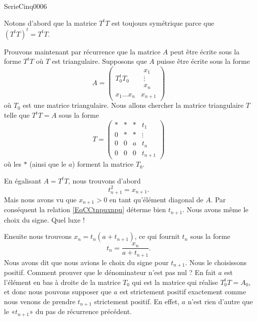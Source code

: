 
\begin{corrige}{SerieCinq0006}

	Notons d'abord que la matrice $T^tT$ est toujours symétrique parce que $(T^tT)^t=T^tT$.

	Prouvons maintenant par récurrence que la matrice $A$ peut être écrite sous la forme $T^tT$ où $T$ est triangulaire. Supposons que $A$ puisse être écrite sous la forme
	\begin{equation}
		A=\begin{pmatrix}
			T_0^tT_0	&	\begin{matrix}
				x_1	\\ 
				\vdots	\\ 
				x_n	
			\end{matrix}\\ 
			x_1\ldots x_n	&	x_{n+1}	
		\end{pmatrix}
	\end{equation}
	où $T_0$ est une matrice triangulaire. Nous allons chercher la matrice triangulaire $T$ telle que $T^tT=A$ sous la forme
	\begin{equation}
		T=\begin{pmatrix}
			 *	&	*	&	*	&	t_1	\\
			 0	&	*	&	*	&	\vdots	\\
			 0	&	0	&	a	&	t_n	\\ 
			 0	&	0	&	0	&	t_{n+1}	 
		 \end{pmatrix}
	\end{equation}
	où les $*$ (ainsi que le $a$) forment la matrice $T_0$.

	En égalisant $A=T^tT$, nous trouvons d'abord
	\begin{equation}	\label{EqCCtnpuxnpu}
		t_{n+1}^2=x_{n+1}.
	\end{equation}
	Mais nous avons vu que $x_{n+1}>0$ en tant qu'élément diagonal de $A$. Par conséquent la relation \eqref{EqCCtnpuxnpu} déterme bien $t_{n+1}$. Nous avons même le choix du signe. Quel luxe !
	
	Ensuite nous trouvons $x_n=t_n(a+t_{n+1})$, ce qui fournit $t_n$ sous la forme
	\begin{equation}
		t_n=\frac{ x_n }{ a+t_{n+1} }.
	\end{equation}
	Nous avons dit que nous avions le choix du signe pour $t_{n+1}$. Nous le choisissons positif. Comment prouver que le dénominateur n'est pas nul ? En fait $a$ est l'élément en bas à droite de la matrice $T_0$ qui est la matrice qui réalise $T_0^tT=A_0$, et donc nous pouvons supposer que $a$ est strictement positif exactement comme nous venons de prendre $t_{n+1}$ strictement positif. En effet, $a$ n'est rien d'autre que le «$t_{n+1}$» du pas de récurrence précédent.

\end{corrige}
